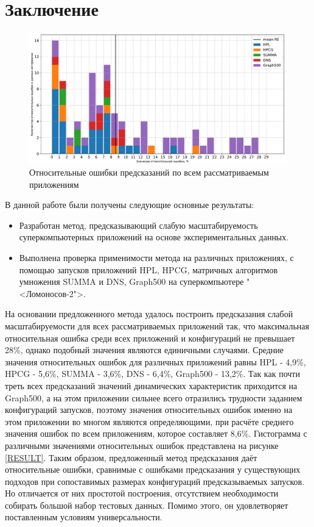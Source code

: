 \section{Заключение}
	\begin{figure}
		\centering
		\includegraphics[width=\textwidth]{./images/RE_graph}
		\caption{Относительные ошибки предсказаний по всем рассматриваемым приложениям}
		\label{RESULT}
	\end{figure}
	В данной работе были получены следующие основные результаты:
	\begin{itemize}
		\item Разработан метод, предсказывающий слабую масштабируемость суперкомпьютерных приложений на основе экспериментальных данных.
		\item Выполнена проверка применимости метода на различных приложениях, с помощью запусков приложений HPL, HPCG, матричных алгоритмов умножения SUMMA и DNS, Graph500 на суперкомпьютере "<Ломоносов-2">.
	\end{itemize}

	На основании предложенного метода удалось построить предсказания слабой масштабируемости для всех рассматриваемых приложений так, что максимальная относительная ошибка среди всех приложений и конфигураций не превышает 28\%, однако подобный значения являются единичными случаями. Средние значения относительных ошибок для различных приложений равны HPL - 4,9\%, HPCG - 5,6\%, SUMMA - 3,6\%, DNS - 6,4\%, Graph500 - 13,2\%. Так как почти треть всех предсказаний значений динамических характеристик приходится на Graph500, а на этом приложении сильнее всего отразились трудности заданием конфигураций запусков, поэтому значения относительных ошибок именно на этом приложении во многом являются определяющими, при расчёте среднего значения ошибок по всем приложениям, которое составляет 8,6\%. Гистограмма с различными значениями относительных ошибок представлена на рисунке \eqref{RESULT}. Таким образом, предложенный метод предсказания даёт относительные ошибки, сравнимые с ошибками предсказания у существующих подходов при сопоставимых размерах конфигураций предсказываемых запусков. Но отличается от них простотой построения, отсутствием необходимости собирать большой набор тестовых данных. Помимо этого, он удовлетворяет поставленным условиям универсальности.
	
\clearpage
